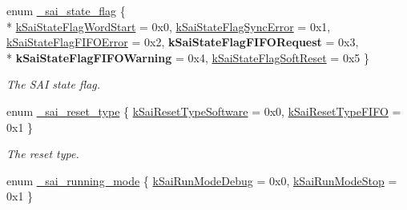 \begin{DoxyCompactItemize}
\item 
enum \hyperlink{group__sai__hal_gaa95d2087778fca116c3d7df0e3bd943e}{\+\_\+sai\+\_\+state\+\_\+flag} \{ \\*
\hyperlink{group__sai__hal_ggaa95d2087778fca116c3d7df0e3bd943ea747d71835f6c43f8a66b19f94cfe02af}{k\+Sai\+State\+Flag\+Word\+Start} = 0x0, 
\hyperlink{group__sai__hal_ggaa95d2087778fca116c3d7df0e3bd943eae22c18fa3ff7a1c353857130fed314fc}{k\+Sai\+State\+Flag\+Sync\+Error} = 0x1, 
\hyperlink{group__sai__hal_ggaa95d2087778fca116c3d7df0e3bd943eac4e977e6c26f8890e08a06731d6604c4}{k\+Sai\+State\+Flag\+F\+I\+F\+O\+Error} = 0x2, 
{\bfseries k\+Sai\+State\+Flag\+F\+I\+F\+O\+Request} = 0x3, 
\\*
{\bfseries k\+Sai\+State\+Flag\+F\+I\+F\+O\+Warning} = 0x4, 
\hyperlink{group__sai__hal_ggaa95d2087778fca116c3d7df0e3bd943ea9916648337198eb0e3006511b1db45f0}{k\+Sai\+State\+Flag\+Soft\+Reset} = 0x5
 \}\begin{DoxyCompactList}\small\item\em The S\+AI state flag. \end{DoxyCompactList}
\item 
enum \hyperlink{group__sai__hal_gaaa4bb640acb35ece5d999635e41f033a}{\+\_\+sai\+\_\+reset\+\_\+type} \{ \hyperlink{group__sai__hal_ggaaa4bb640acb35ece5d999635e41f033aa8f001b7b83c6392a035822f94d56f95a}{k\+Sai\+Reset\+Type\+Software} = 0x0, 
\hyperlink{group__sai__hal_ggaaa4bb640acb35ece5d999635e41f033aaa991189bedccd57458e4292a816c0d21}{k\+Sai\+Reset\+Type\+F\+I\+FO} = 0x1
 \}\begin{DoxyCompactList}\small\item\em The reset type. \end{DoxyCompactList}
\item 
enum \hyperlink{group__sai__hal_gaf88043ae2cb5faaa066820476c2665e6}{\+\_\+sai\+\_\+running\+\_\+mode} \{ \hyperlink{group__sai__hal_ggaf88043ae2cb5faaa066820476c2665e6a1ac7d3f5aae643fbf4e5f3209aa14b00}{k\+Sai\+Run\+Mode\+Debug} = 0x0, 
\hyperlink{group__sai__hal_ggaf88043ae2cb5faaa066820476c2665e6aadc9f2705a6354a343cc1080c6865e0b}{k\+Sai\+Run\+Mode\+Stop} = 0x1
 \}
\end{DoxyCompactItemize}
